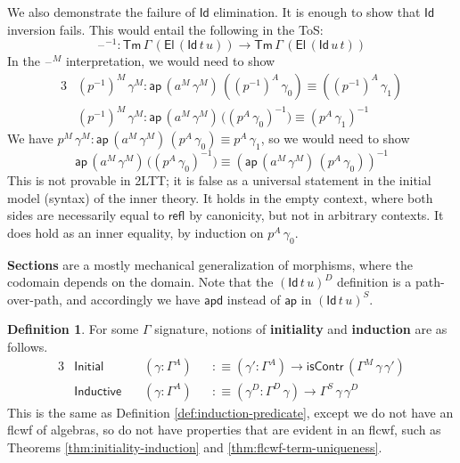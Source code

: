 \documentclass[12pt,a4paper,twoside,openany]{book}
\theoremstyle{remark}
\theoremstyle{definition}
\newtheorem{mydefinition}{Definition}
\theoremstyle{theorem}
\newcommand{\ms}[1]{\mathsf{#1}}
\newcommand{\ap}{\ms{ap}}
\newcommand{\apd}{\ms{apd}}
\newcommand{\refl}{\mathsf{refl}}
\newcommand{\Tm}{\mathsf{Tm}}
\newcommand{\El}{\mathsf{El}}
\newcommand{\Id}{\mathsf{Id}}
\newcommand{\blank}{\mathord{\hspace{1pt}\text{--}\hspace{1pt}}}
\newcommand{\defn}{:\equiv}
\begin{document}
We also demonstrate the failure of $\Id$ elimination. It is enough to show that
$\Id$ inversion fails. This would entail the following in the ToS:
\[
  \blank^{-1} : \Tm\,\Gamma\,(\El\,(\Id\,t\,u)) \to \Tm\,\Gamma\,(\El\,(\Id\,u\,t))
\]
In the $\blank^M$ interpretation, we would need to show
\begin{alignat*}{3}
  &(p^{-1})^M\,\gamma^M : \ap\,(a^M\,\gamma^M)\,((p^{-1})^A\,\gamma_0) \equiv ((p^{-1})^A\,\gamma_1)\\
  &(p^{-1})^M\,\gamma^M : \ap\,(a^M\,\gamma^M)\, \big((p^A\,\gamma_0)^{-1}\big) \equiv (p^A\,\gamma_1)^{-1}
\end{alignat*}
We have $p^M\,\gamma^M : \ap\,(a^M\,\gamma^M)\,(p^A\,\gamma_0) \equiv p^A\,\gamma_1$,
so we would need to show
\[
  \ap\,(a^M\,\gamma^M)\, \big((p^A\,\gamma_0)^{-1}\big) \equiv (\ap\,(a^M\,\gamma^M)\,(p^A\,\gamma_0))^{-1}
\]
This is not provable in 2LTT; it is false as a universal statement in the
initial model (syntax) of the inner theory. It holds in the empty context, where
both sides are necessarily equal to $\refl$ by canonicity, but not in arbitrary
contexts. It does hold as an inner equality, by induction on $p^A\,\gamma_0$.

\textbf{Sections} are a mostly mechanical generalization of morphisms, where the
codomain depends on the domain. Note that the $(\Id\,t\,u)^D$ definition is a
path-over-path, and accordingly we have $\apd$ instead of $\ap$ in $(\Id\,t\,u)^S$.

\begin{mydefinition} For some $\Gamma$ signature, notions of \textbf{initiality} and \textbf{induction} are
as follows.
\begin{alignat*}{3}
  &\ms{Initial}\,&&(\gamma : \Gamma^A) &&\defn (\gamma' : \Gamma^A) \to \ms{isContr}\,(\Gamma^M\,\gamma\,\gamma')\\
  &\ms{Inductive}\,&&(\gamma : \Gamma^A) &&\defn (\gamma^D : \Gamma^D\,\gamma) \to \Gamma^S\,\gamma\,\gamma^D
\end{alignat*}
This is the same as Definition \ref{def:induction-predicate}, except we do not have an
flcwf of algebras, so do not have properties that are evident in an flcwf, such
as Theorems \ref{thm:initiality-induction} and \ref{thm:flcwf-term-uniqueness}.
\end{mydefinition}
\end{document}
